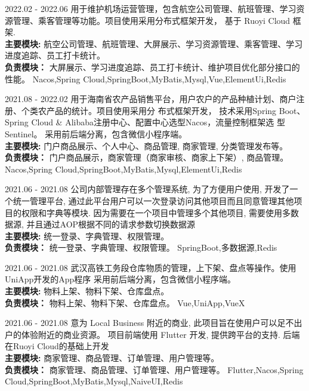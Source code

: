 \documentclass[zh]{resume}
\begin{document}
\begin{projects}
	\project
  {\color{accentcolor}{机场运营管理}}{2022.02 - 2022.06}
  {
    用于维护机场运营管理，包含航空公司管理、航班管理、学习资源管理、乘客管理等功能。项目使用采用分布式框架开发，
    基于 Ruoyi Cloud 框架. \\
  {\textbf{主要模块: } 航空公司管理、航班管理、大屏展示、学习资源管理、乘客管理、学习进度追踪、员工打卡统计。} \\
  {\textbf{负责模块：} 大屏展示、学习进度追踪、员工打卡统计、维护项目优化部分接口的性能。}
  }
  {Nacos,Spring Cloud,SpringBoot,MyBatis,Mysql,Vue,ElementUi,Redis}

	\project
  {\color{accentcolor}{田园网}}{2021.08 - 2022.02}
  {
    用于海南省农产品销售平台，用户农户的产品种植计划、商户注册、个类农产品的统计。项目使用采用分 布式框架开发，
    技术采用Spring Boot、Spring Cloud \& Alibaba注册中心、配置中心选型Nacos，流量控制框架选 型Sentinel。
    采用前后端分离，包含微信小程序端。\\ 
  {\textbf{主要模块: } 门户商品展示、个人中心、商品管理, 商家管理, 分类管理发布等。} \\
  {\textbf{负责模块：} 门户商品展示，商家管理（商家审核、商家上下架）, 商品管理。}
  }
  {Nacos,Spring Cloud,SpringBoot,MyBatis,Mysql,ElementUi,Redis}

	\project
  {\color{accentcolor}{统一管理平台}}{2021.06 - 2021.08}
  {
    公司内部管理存在多个管理系统, 为了方便用户使用, 开发了一个统一管理平台, 
    通过此平台用户可以一次登录访问其他项目而且同意管理其他项目的权限和字典等模块. 
    因为需要在一个项目中管理多个其他项目, 需要使用多数据源, 并且通过AOP根据不同的请求参数切换数据源\\
    {\textbf{主要模块: } 统一登录、字典管理、权限管理。} \\
    {\textbf{负责模块：} 统一登录、字典管理、权限管理。}
  }
  {SpringBoot,多数据源,Redis}

	\project
  {\color{accentcolor}{武汉高铁工务段仓库APP}}{2021.06 - 2021.08}
  {
    武汉高铁工务段仓库物质的管理，上下架、盘点等操作。使用UniApp开发的App程序
    采用前后端分离，包含微信小程序端。\\ 
    {\textbf{主要模块: } 物料上架、物料下架、仓库盘点。} \\
    {\textbf{负责模块：} 物料上架、物料下架、仓库盘点。}
  }
  {Vue,UniApp,VueX}


	\project
  {\color{accentcolor}{LocalBiz}}{2021.06 - 2021.08}
  {
    意为 Local Business 附近的商业,  此项目旨在使用户可以足不出户的体验附近的商业资源。
    项目前端使用 Flutter 开发, 提供跨平台的支持. 后端在Ruoyi Cloud的基础上开发 \\
    {\textbf{主要模块: } 商家管理、商品管理、订单管理、用户管理等。} \\
    {\textbf{负责模块：} 商家管理、商品管理、订单管理、用户管理等。}
  }
  {Flutter,Nacos,Spring Cloud,SpringBoot,MyBatis,Mysql,NaiveUI,Redis}




\end{projects}
\end{document}
